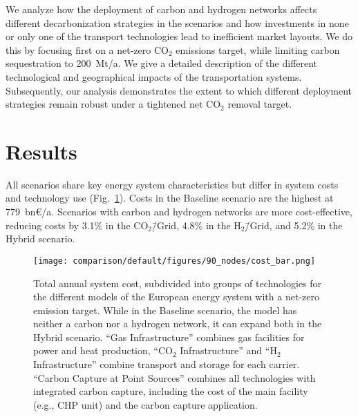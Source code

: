 \documentclass[twocolumn]{article}
\newcommand{\carbon}{CO$_2$}
\newcommand{\hydrogen}{H$_2$}
\newcommand{\carbongrid}{CO$_2$\=/Grid}
\newcommand{\hydrogengrid}{H$_2$\=/Grid}
\newcommand{\baselinescenario}{Baseline scenario}
\newcommand{\hybridscenario}{Hybrid scenario}
\begin{document}
We analyze how the deployment of carbon and hydrogen networks affects different decarbonization strategies in the scenarios and how investments in none or only one of the transport technologies lead to inefficient market layouts. We do this by focusing first on a net-zero \carbon{} emissions target, while limiting carbon sequestration to 200~Mt/a. We give a detailed description of the different technological and geographical impacts of the transportation systems. Subsequently, our analysis demonstrates the extent to which different deployment strategies remain robust under a tightened net \carbon{} removal target.


\section{Results}
\label{sec:results}


All scenarios share key energy system characteristics but differ in system costs and technology use (Fig.~\ref{fig:cost_bar}). Costs in the \baselinescenario{} are the highest at 779~bn€/a. Scenarios with carbon and hydrogen networks are more cost-effective, reducing costs by 3.1\% in the \carbongrid{}, 4.8\% in the \hydrogengrid{}, and 5.2\% in the \hybridscenario{}.

\begin{figure}[ht!]
    \centering
    \texttt{[image: comparison/default/figures/90\_nodes/cost\_bar.png]}
    \caption[short]{Total annual system cost, subdivided into groups of technologies for the different models of the European energy system with a net-zero emission target. While in the \baselinescenario{}, the model has neither a carbon nor a hydrogen network, it can expand both in the \hybridscenario{}. ``Gas Infrastructure'' combines gas facilities for power and heat production, ``\carbon{} Infrastructure'' and ``\hydrogen{} Infrastructure'' combine transport and storage for each carrier. ``Carbon Capture at Point Sources'' combines all technologies with integrated carbon capture, including the cost of the main facility (e.g., CHP unit) and the carbon capture application.}
    \label{fig:cost_bar}
\end{figure}

\end{document}
